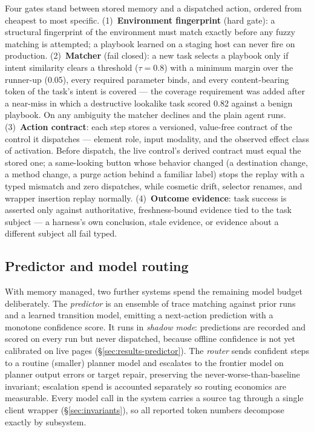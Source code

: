 \documentclass{article} %
\begin{document}
Four gates stand between stored memory and a dispatched action, ordered from cheapest to
most specific. (1)~\textbf{Environment fingerprint} (hard gate): a structural fingerprint
of the environment must match exactly before any fuzzy matching is attempted; a playbook
learned on a staging host can never fire on production. (2)~\textbf{Matcher} (fail
closed): a new task selects a playbook only if intent similarity clears a threshold
($\tau = 0.8$) with a minimum margin over the runner-up (0.05), every required parameter
binds, and every content-bearing token of the task's intent is covered --- the coverage
requirement was added after a near-miss in which a destructive lookalike task scored
0.82 against a benign playbook. On any ambiguity the matcher declines and the plain
agent runs. (3)~\textbf{Action contract}: each step stores a versioned, value-free
contract of the control it dispatches --- element role, input modality, and the
observed effect class of activation. Before dispatch, the live control's derived
contract must equal the stored one; a same-looking button whose behavior changed (a
destination change, a method change, a purge action behind a familiar label) stops the
replay with a typed mismatch and zero dispatches, while cosmetic drift, selector
renames, and wrapper insertion replay normally. (4)~\textbf{Outcome evidence}: task
success is asserted only against authoritative, freshness-bound evidence tied to the
task subject --- a harness's own conclusion, stale evidence, or evidence about a
different subject all fail typed.

\subsection{Predictor and model routing}
\label{sec:routing}

With memory managed, two further systems spend the remaining model budget deliberately.
The \emph{predictor} is an ensemble of trace matching against prior runs and a learned
transition model, emitting a next-action prediction with a monotone confidence score. It
runs in \emph{shadow mode}: predictions are recorded and scored on every run but never
dispatched, because offline confidence is not yet calibrated on live pages
(\S\ref{sec:results-predictor}). The \emph{router} sends confident steps to a routine
(smaller) planner model and escalates to the frontier model on planner output errors or
target repair, preserving the never-worse-than-baseline invariant; escalation spend is
accounted separately so routing economics are measurable. Every model call in the system
carries a source tag through a single client wrapper (\S\ref{sec:invariants}), so all
reported token numbers decompose exactly by subsystem.
\end{document}
